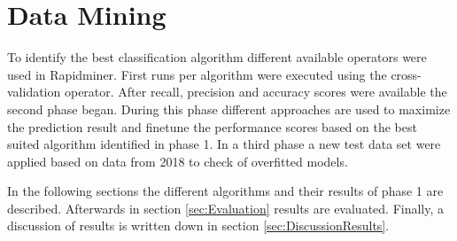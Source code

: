 \section{Data Mining}

To identify the best classification algorithm different available operators were used in Rapidminer.
First runs per algorithm were executed using the cross-validation operator. After recall, precision and accuracy scores were available the second phase began. During this phase different approaches are used to maximize the prediction result and finetune the performance scores based on the best suited algorithm identified in phase 1. In a third phase a new test data set were applied based on data from 2018 to check of overfitted models. \newline

In the following sections the different algorithms and their results of phase 1 are described. 
Afterwards in section \ref{sec:Evaluation} results are evaluated.
Finally, a discussion of results is written down in section \ref{sec:DiscussionResults}. 







